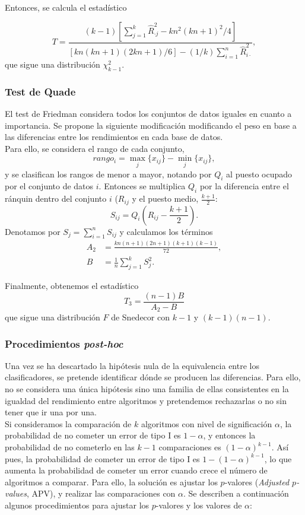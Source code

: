 	Entonces, se calcula el estadístico 

	\[
		T = \frac{(k-1)
				\left[
					\sum\limits_{j=1}^k
						\hat{R}_{\cdot j}^2 -
					kn^2(kn+1)^2/4
				\right]}
				{[kn(kn+1)(2kn+1)/6] 
				 - (1/k) \sum\limits_{i=1}^n 
				 			\hat{R}_{i \cdot}^2},
	\]
	que sigue una distribución $\chi^2_{k-1}$.
	
\subsubsection{Test de Quade}

	El test de Friedman considera todos los conjuntos de 
datos iguales en cuanto a importancia. Se propone la 
siguiente modificación modificando el peso en base a las
diferencias entre los rendimientos en cada base de datos.\\
	Para ello, se considera el rango de cada conjunto,
	\[ rango_i = \underset{j}{\max} \{x_{ij}\} - 
				 \underset{j}{\min} \{x_{ij}\},
	\]
	y se clasifican los rangos de menor a mayor, notando por 
$Q_i$ al puesto ocupado por el conjunto de datos $i$.
Entonces se multiplica $Q_i$ por la diferencia entre el 
ránquin dentro del conjunto $i$ ($R_{ij}$ y el puesto medio,
$\frac{k+1}{2}$:
	\[ 
		S_{ij} = Q_i 
				\left( R_{ij} - \frac{k+1}{2} \right).
	\]
	Denotamos por $S_j = \sum\limits_{i=1}^n S_{ij}$ y
calculamos los términos
\begin{align*}
		A_2 &= \frac{kn(n+1)(2n+1)(k+1)(k-1)}{72},\\
		B &= \frac{1}{n} \sum\limits_{j=1}^k S_j^2.
\end{align*}

	Finalmente, obtenemos el estadístico
	\[
		T_3 = \frac{(n-1)B}{A_2 - B}
	\]
	que sigue una distribución $F$ de Snedecor con $k-1$ y
$(k-1)(n-1)$.
	

\subsubsection{Procedimientos \textit{post-hoc}}

	Una vez se ha descartado la hipótesis nula de 
la equivalencia entre los clasificadores, se pretende
identificar dónde se producen las diferencias. Para ello,
no se considera una única hipótesis sino una familia 
de ellas consistentes en la igualdad del rendimiento entre 
algoritmos y pretendemos rechazarlas o no sin tener que ir 
una por una.\\
	Si consideramos la comparación de $k$ algoritmos con 
nivel de significación $\alpha$, la probabilidad de no 
cometer un error de tipo I es $1-\alpha$, y entonces la 
probabilidad de no cometerlo en las $k-1$ comparaciones es
$(1-\alpha)^{k-1}$. Así pues, la probabilidad de cometer un
error de tipo I es $1-(1-\alpha)^{k-1}$, lo que aumenta 
la probabilidad de cometer un error cuando crece el número 
de algoritmos a comparar. Para ello, la solución es 
ajustar los $p$-valores (\textit{Adjusted $p$-values}, APV), 
y realizar las comparaciones con $\alpha$. Se describen a continuación algunos procedimientos para ajustar los 
$p$-valores y los valores de $\alpha$:

